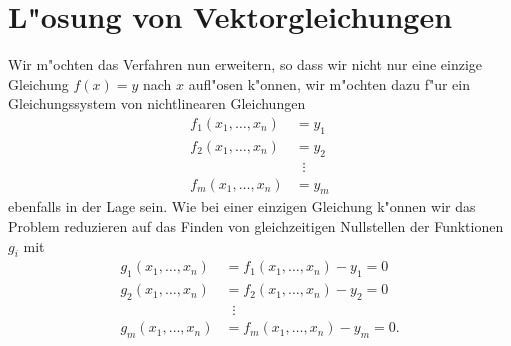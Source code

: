 \section{L"osung von Vektorgleichungen\label{section:newton:vektor}}
Wir m"ochten das Verfahren nun erweitern, so dass wir nicht nur eine
einzige Gleichung $f(x)=y$ nach $x$ aufl"osen k"onnen, wir m"ochten dazu 
f"ur ein Gleichungssystem von nichtlinearen Gleichungen
\begin{align*}
f_1(x_1,\dots,x_n)&=y_1\\
f_2(x_1,\dots,x_n)&=y_2\\
&\;\;\vdots\\
f_m(x_1,\dots,x_n)&=y_m
\end{align*}
ebenfalls in der Lage sein.
Wie bei einer einzigen Gleichung k"onnen wir das Problem reduzieren
auf das Finden von gleichzeitigen Nullstellen der Funktionen $g_i$ mit
\begin{align*}
g_1(x_1,\dots,x_n)&=f_1(x_1,\dots,x_n)-y_1=0\\
g_2(x_1,\dots,x_n)&=f_2(x_1,\dots,x_n)-y_2=0\\
&\;\;\vdots\\
g_m(x_1,\dots,x_n)&=f_m(x_1,\dots,x_n)-y_m=0.
\end{align*}










